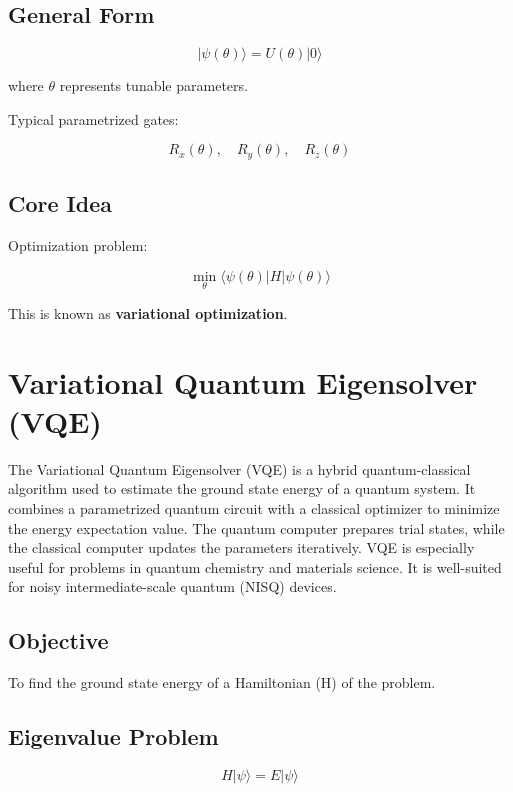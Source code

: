 \subsection*{General Form}

\[
|\psi(\theta)\rangle = U(\theta) |0\rangle
\]

where $\theta$ represents tunable parameters.

Typical parametrized gates:

\[
R_x(\theta), \quad R_y(\theta), \quad R_z(\theta)
\]

\subsection*{Core Idea}

Optimization problem:

\[
\min_{\theta} \langle \psi(\theta) | H | \psi(\theta) \rangle
\]

This is known as \textbf{variational optimization}.

\vspace{0.5cm}

\section{Variational Quantum Eigensolver (VQE)}

The Variational Quantum Eigensolver (VQE) is a hybrid quantum-classical algorithm used to estimate the ground state energy of a quantum system.
It combines a parametrized quantum circuit with a classical optimizer to minimize the energy expectation value.
The quantum computer prepares trial states, while the classical computer updates the parameters iteratively.
VQE is especially useful for problems in quantum chemistry and materials science.
It is well-suited for noisy intermediate-scale quantum (NISQ)\cite{RevModPhys.94.015004} devices.


\subsection*{Objective}

To find the ground state energy of a Hamiltonian (H) of the problem.

\subsection*{Eigenvalue Problem}

\[
H |\psi\rangle = E |\psi\rangle
\]

